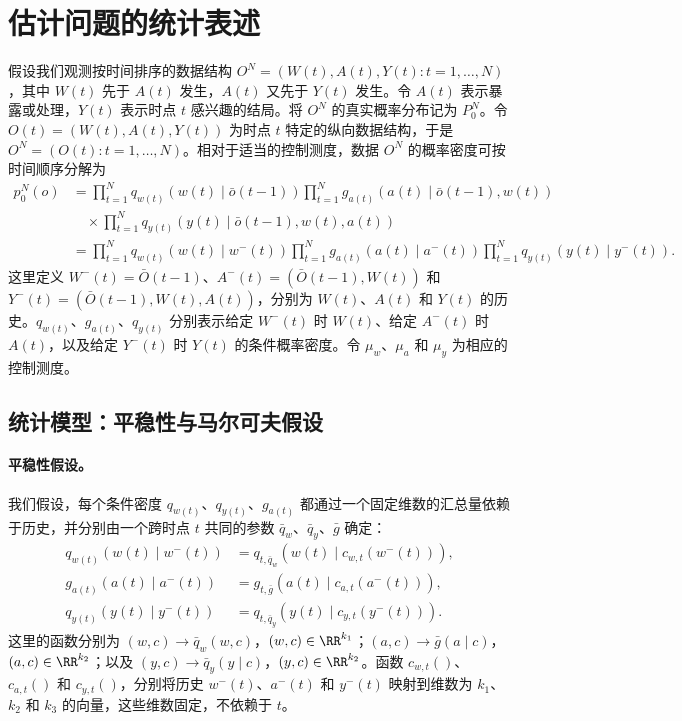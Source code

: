 \section{估计问题的统计表述}

假设我们观测按时间排序的数据结构 $O^N=(W(t),A(t),Y(t):t=1,\ldots,N)$，其中 $W(t)$ 先于 $A(t)$ 发生，$A(t)$ 又先于 $Y(t)$ 发生。令 $A(t)$ 表示暴露或处理，$Y(t)$ 表示时点 $t$ 感兴趣的结局。将 $O^N$ 的真实概率分布记为 $P_0^N$。令 $O(t)=(W(t),A(t),Y(t))$ 为时点 $t$ 特定的纵向数据结构，于是 $O^N=(O(t):t=1,\ldots,N)$。相对于适当的控制测度，数据 $O^N$ 的概率密度可按时间顺序分解为
\[
\begin{aligned}
 p_0^N(o)
 &=\prod_{t=1}^N q_{w(t)}(w(t)\mid\bar o(t-1))
 \prod_{t=1}^N g_{a(t)}(a(t)\mid\bar o(t-1),w(t))\\
 &\quad\times\prod_{t=1}^N q_{y(t)}(y(t)\mid\bar o(t-1),w(t),a(t))\\
 &=\prod_{t=1}^N q_{w(t)}(w(t)\mid w^-(t))
 \prod_{t=1}^N g_{a(t)}(a(t)\mid a^-(t))
 \prod_{t=1}^N q_{y(t)}(y(t)\mid y^-(t)).
\end{aligned}
\]
这里定义 $W^-(t)=\bar O(t-1)$、$A^-(t)=(\bar O(t-1),W(t))$ 和 $Y^-(t)=(\bar O(t-1),W(t),A(t))$，分别为 $W(t)$、$A(t)$ 和 $Y(t)$ 的历史。$q_{w(t)}$、$g_{a(t)}$、$q_{y(t)}$ 分别表示给定 $W^-(t)$ 时 $W(t)$、给定 $A^-(t)$ 时 $A(t)$，以及给定 $Y^-(t)$ 时 $Y(t)$ 的条件概率密度。令 $\mu_w$、$\mu_a$ 和 $\mu_y$ 为相应的控制测度。

\subsection{统计模型：平稳性与马尔可夫假设}

\paragraph{平稳性假设。}
我们假设，每个条件密度 $q_{w(t)}$、$q_{y(t)}$、$g_{a(t)}$ 都通过一个固定维数的汇总量依赖于历史，并分别由一个跨时点 $t$ 共同的参数 $\bar q_w$、$\bar q_y$、$\bar g$ 确定：
\[
\begin{aligned}
 q_{w(t)}(w(t)\mid w^-(t))&=q_{t,\bar q_w}(w(t)\mid c_{w,t}(w^-(t))),\\
 g_{a(t)}(a(t)\mid a^-(t))&=g_{t,\bar g}(a(t)\mid c_{a,t}(a^-(t))),\\
 q_{y(t)}(y(t)\mid y^-(t))&=q_{t,\bar q_y}(y(t)\mid c_{y,t}(y^-(t))).
\end{aligned}
\]
这里的函数分别为 $(w,c)\to\bar q_w(w,c)$，$(w,c)\in\RR^{k_1}$；$(a,c)\to\bar g(a\mid c)$，$(a,c)\in\RR^{k_2}$；以及 $(y,c)\to\bar q_y(y\mid c)$，$(y,c)\in\RR^{k_2}$。函数 $c_{w,t}()$、$c_{a,t}()$ 和 $c_{y,t}()$，分别将历史 $w^-(t)$、$a^-(t)$ 和 $y^-(t)$ 映射到维数为 $k_1$、$k_2$ 和 $k_3$ 的向量，这些维数固定，不依赖于 $t$。

